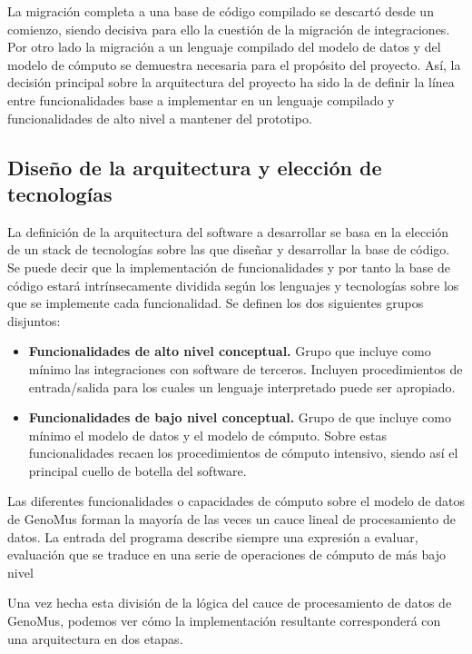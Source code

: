 La migración completa a una base de código compilado se descartó desde un comienzo, siendo decisiva para ello la cuestión de la migración de integraciones. Por otro lado la migración a un lenguaje compilado del modelo de datos y del modelo de cómputo se demuestra necesaria para el propósito del proyecto. Así, la decisión principal sobre la arquitectura del proyecto ha sido la de definir la línea entre funcionalidades base a implementar en un lenguaje compilado y funcionalidades de alto nivel a mantener del prototipo.

\subsection{Diseño de la arquitectura y elección de tecnologías}

La definición de la arquitectura del software a desarrollar se basa en la elección de un stack de tecnologías sobre las que diseñar y desarrollar la base de código. Se puede decir que la implementación de funcionalidades y por tanto la base de código estará intrínsecamente dividida según los lenguajes y tecnologías sobre los que se implemente cada funcionalidad. Se definen los dos siguientes grupos disjuntos:

\begin{itemize}
    \item \textbf{Funcionalidades de alto nivel conceptual.} Grupo que incluye como mínimo las integraciones con software de terceros. Incluyen procedimientos de entrada/salida para los cuales un lenguaje interpretado puede ser apropiado.
    
    \item \textbf{Funcionalidades de bajo nivel conceptual.} Grupo de que incluye como mínimo el modelo de datos y el modelo de cómputo. Sobre estas funcionalidades recaen los procedimientos de cómputo intensivo, siendo así el principal cuello de botella del software.
\end{itemize}

Las diferentes funcionalidades o capacidades de cómputo sobre el modelo de datos de GenoMus forman la mayoría de las veces un cauce lineal de procesamiento de datos. La entrada del programa describe siempre una expresión a evaluar, evaluación que se traduce en una serie de operaciones de cómputo de más bajo nivel

Una vez hecha esta división de la lógica del cauce de procesamiento de datos de GenoMus, podemos ver cómo la implementación resultante corresponderá con una arquitectura en dos etapas.

